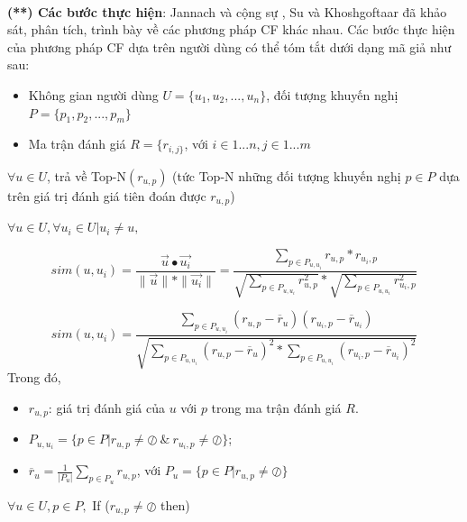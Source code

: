 \\\textbf{(**) Các bước thực hiện}: Jannach và cộng sự \cite{Jannach:2010:RSI}, Su và Khoshgoftaar \cite{Su:2009:SCF} đã khảo sát, phân tích, trình bày về các phương pháp CF khác nhau. Các bước thực hiện của phương pháp CF dựa trên người dùng có thể tóm tắt dưới dạng mã giả như sau:
\begin{algorithm}[H]
	\begin{itemize}
		\item Không gian người dùng $U = \{{u_{1}, u_{2}, ..., u_{n}}\}$, đối tượng khuyến nghị $P = \{{p_{1}, p_{2}, ..., p_{m}}\}$
		\item Ma trận đánh giá $R = \{r_{i,j\}}$,  với $i \in 1...n, j \in 1...m$ 
	\end{itemize}
	 $ \forall u \in U$, trả về Top-N$(r_{u,p})$ (tức Top-N những đối tượng khuyến nghị $p \in P$ dựa trên giá trị đánh giá tiên đoán được $r_{u,p}$)\\
	\text{--------------------------------------------------------------------------------------------------------------}
\begin{algorithmic}[1]	
\State $\forall u \in U, \forall u_{i} \in U | u_{i} \neq u,$

\begin{equation}
\displaystyle sim(u,u_{i}) = 
\frac{\overrightarrow{u} \bullet \overrightarrow{u_{i}}}{\parallel \overrightarrow{u} \parallel \ast \parallel \overrightarrow{u_{i}}\parallel} = 
\frac{\sum_{p \in P_{u,u_{i}}}^{} r_{u,p}*r_{u_{i},p}}
{\sqrt{\sum_{p \in P_{u,u_{i}} }^{}r_{u,p}^2} * \sqrt{\sum_{p \in P_{u,u_{i}} }^{}r_{u_{i},p}^2}}
\end{equation}

\begin{equation}
\displaystyle sim(u,u_{i}) = \frac{\sum_{p \in P_{u,u_{i}}} (r_{u,p} - \overline{r}_{u})(r_{u_{i},p} - \overline{r}_{u_{i}})}
{
\sqrt{
\sum_{p \in P_{u,u_{i}}}^{}(r_{u,p} - \overline{r}_{u})^2 * 
\sum_{p \in P_{u,u_{i}}}^{}(r_{u_{i},p} - \overline{r}_{u_{i}})^2}
}
\end{equation}
{Trong đó,}
\begin{itemize}
	\item $r_{u,p}$: giá trị đánh giá của $u$ với $p$ trong ma trận đánh giá $R$.
	\item $P_{u,u_{i}} = \{p \in P | r_{u,p} \neq \oslash \: \& \: r_{u_{i},p} \neq \oslash \}$; 
	\item $\displaystyle \overline{r}_{u} = \frac{1}{|P_{u}|}\sum_{p \in P_{u}}^{}r_{u,p}$, với $P_{u} = \{p \in P | r_{u,p} \neq \oslash \}$
\end{itemize}
\State $ \forall u \in U, p \in P,$ If ($r_{u,p} \neq \oslash$ then)


\end{algorithmic}
\end{algorithm}
